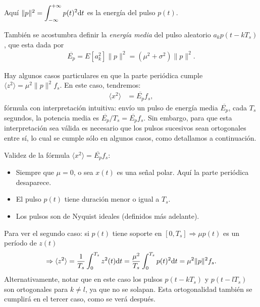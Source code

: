 Aquí  $\|p\|^2 = \displaystyle\int_{-\infty}^{+\infty} p(t)^2\mathrm{d} t$
es la energía del pulso $p(t)$.
%

También se acostumbra definir la \emph{energía media} del pulso aleatorio $a_k p(t-kT_s)$,
que esta dada por
\begin{align*}
    \overline{E_p} = E[a_k^2] \|p\|^2  = (\mu^2+ \sigma^2)\|p\|^2 .
\end{align*}


\noindent Hay algunos casos particulares en que la parte periódica cumple  $\langle
z^2\rangle = \mu^2 \|p\|^2 f_s$. En este caso, tendremos:
\begin{align*}
    \langle x^2\rangle  & = \overline{E_p} f_s,
\end{align*}
fórmula con interpretación intuitiva: envío un pulso de energía media $\overline{E_p}$, cada $T_s$ segundos,
la potencia media es $\overline{E_p}/T_s = \overline{E_p} f_s$. Sin embargo, para que esta interpretación sea válida es necesario que los pulsos
sucesivos sean ortogonales entre sí, lo cual se cumple sólo en algunos casos, como detallamos a continuación.


Validez de la fórmula $\langle x^2\rangle  =
{\overline{E_p}}{f_s}$:
\begin{itemize}
    \item Siempre que $\mu=0$, o sea $x(t)$ es una señal polar. Aquí la parte periódica desaparece.
    \item El pulso $p(t)$ tiene duración menor o igual a $T_s$.
    \item Los pulsos son de Nyquist ideales (definidos más adelante).
\end{itemize}

Para ver el segundo caso: si $p(t)$ tiene soporte en
$[0,T_s]\Rightarrow \mu p(t)$ es un período de $z(t)$
\[\Rightarrow \langle z^2\rangle  = \frac{1}{T_s} \int_0^{T_s} z^2(t)\mathrm{d} t = \frac{\mu^2}{T_s}\int_0^{T_s} p(t)^2\mathrm{d} t=
 \mu^2
\|p\|^2 f_s.\]
Alternativamente, notar que en este caso los pulsos $p(t-kT_s)$ y $p(t-lT_s)$ son ortogonales para $k\neq l$, ya que no se solapan. Esta ortogonalidad también se cumplirá en el tercer caso, como se verá después.
